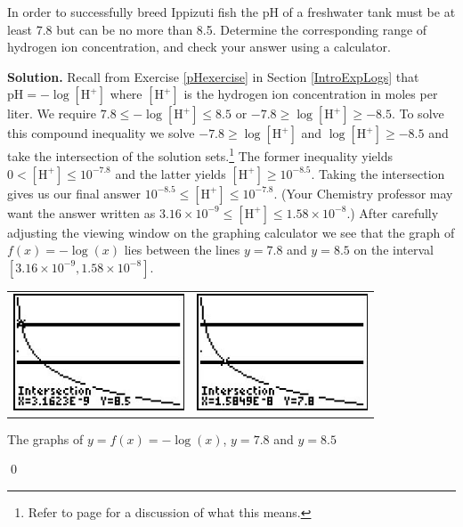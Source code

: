 \begin{ex}

In order to successfully breed Ippizuti fish the pH of a freshwater tank must be at least 7.8 but can be no more than 8.5.  Determine the corresponding range of hydrogen ion concentration, and check your answer using a calculator.

\smallskip

{\bf Solution.}  Recall from Exercise \ref{pHexercise} in Section \ref{IntroExpLogs} that $\mbox{pH} = -\log[\mbox{H}^{+}]$ where $[\mbox{H}^{+}]$ is the hydrogen ion concentration in moles per liter.  We require $7.8 \leq -\log[\mbox{H}^{+}] \leq 8.5$ or $-7.8 \geq \log[\mbox{H}^{+}] \geq -8.5$.  To solve this compound inequality we solve $-7.8 \geq \log[\mbox{H}^{+}]$ and $ \log[\mbox{H}^{+}] \geq -8.5$ and take the intersection of the solution sets.\footnote{Refer to page \pageref{intersectionunion} for a discussion of what this means.}  The former inequality yields $0 < [\mbox{H}^{+}] \leq 10^{-7.8}$ and the latter yields $[\mbox{H}^{+}] \geq 10^{-8.5}$.  Taking the intersection gives us our final answer $10^{-8.5} \leq [\mbox{H}^{+}] \leq 10^{-7.8}$.  (Your Chemistry professor may want the answer written as $3.16 \times 10^{-9} \leq [\mbox{H}^{+}] \leq 1.58 \times 10^{-8}$.)  After carefully adjusting the viewing window on the graphing calculator we see that the graph of $f(x) = -\log(x)$ lies between the lines $y = 7.8$ and $y = 8.5$ on the interval $[3.16 \times 10^{-9}, 1.58 \times 10^{-8}]$.

\smallskip

\begin{center}

\begin{tabular}{cc}

\includegraphics[width=2in]{./ExpLogsGraphics/LogEqns13.jpg}  \hspace{0.75in} & \includegraphics[width=2in]{./ExpLogsGraphics/LogEqns14.jpg}  \\

\end{tabular}

\end{center}

\centerline{The graphs of $y = f(x) = -\log(x)$, \boldmath $y = 7.8$ and \boldmath $y = 8.5$}

\qed

\end{ex}

